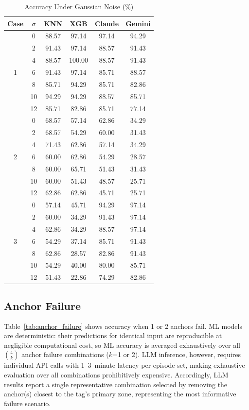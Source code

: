 \documentclass[conference]{IEEEtran}
\begin{document}
\begin{table}[htbp]
\caption{Accuracy Under Gaussian Noise (\%)}
\begin{center}
\scriptsize
\begin{tabular}{|c|c|cc|cc|}
\hline
\textbf{Case} & $\sigma$ & \textbf{KNN} & \textbf{XGB} & \textbf{Claude} & \textbf{Gemini} \\
\hline
\multirow{7}{*}{1}
 & 0  & 88.57 & 97.14 & 97.14 & 94.29 \\
 & 2  & 91.43 & 97.14 & 88.57 & 91.43 \\
 & 4  & 88.57 & 100.00 & 88.57 & 91.43 \\
 & 6  & 91.43 & 97.14 & 85.71 & 88.57 \\
 & 8  & 85.71 & 94.29 & 85.71 & 82.86 \\
 & 10 & 94.29 & 94.29 & 88.57 & 85.71 \\
 & 12 & 85.71 & 82.86 & 85.71 & 77.14 \\
\hline
\multirow{7}{*}{2}
 & 0  & 68.57 & 57.14 & 62.86 & 34.29 \\
 & 2  & 68.57 & 54.29 & 60.00 & 31.43 \\
 & 4  & 71.43 & 62.86 & 57.14 & 34.29 \\
 & 6  & 60.00 & 62.86 & 54.29 & 28.57 \\
 & 8  & 60.00 & 65.71 & 51.43 & 31.43 \\
 & 10 & 60.00 & 51.43 & 48.57 & 25.71 \\
 & 12 & 62.86 & 62.86 & 45.71 & 25.71 \\
\hline
\multirow{7}{*}{3}
 & 0  & 57.14 & 45.71 & 94.29 & 97.14 \\
 & 2  & 60.00 & 34.29 & 91.43 & 97.14 \\
 & 4  & 62.86 & 34.29 & 88.57 & 97.14 \\
 & 6  & 54.29 & 37.14 & 85.71 & 91.43 \\
 & 8  & 62.86 & 28.57 & 82.86 & 91.43 \\
 & 10 & 54.29 & 40.00 & 80.00 & 85.71 \\
 & 12 & 51.43 & 22.86 & 74.29 & 82.86 \\
\hline
\end{tabular}
\label{tab:noise_all}
\end{center}
\end{table}

\subsection{Anchor Failure}
Table~\ref{tab:anchor_failure} shows accuracy when 1 or 2 anchors fail. ML models are deterministic: their predictions for identical input are reproducible at negligible computational cost, so ML accuracy is averaged exhaustively over all $\binom{4}{k}$ anchor failure combinations ($k$=1 or 2). LLM inference, however, requires individual API calls with 1--3~minute latency per episode set, making exhaustive evaluation over all combinations prohibitively expensive. Accordingly, LLM results report a single representative combination selected by removing the anchor(s) closest to the tag's primary zone, representing the most informative failure scenario.
\end{document}
